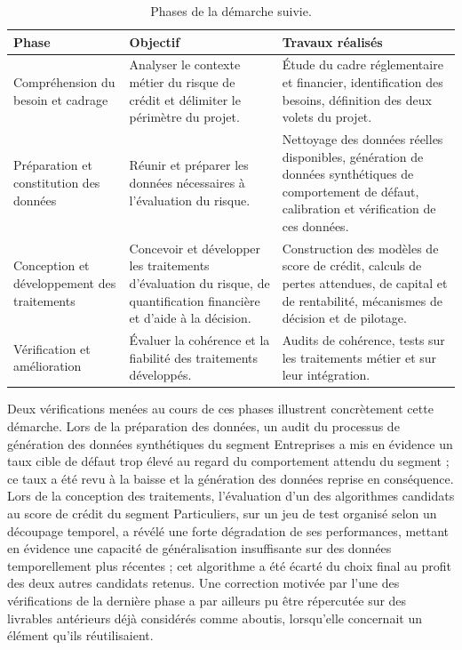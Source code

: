 \begin{table}[htbp]
    \centering
    \footnotesize
    \caption{Phases de la démarche suivie.}
    \label{tab:phases-demarche}
    \begin{tabular}{p{3.2cm}p{5cm}p{6cm}}
        \toprule
        \textbf{Phase} & \textbf{Objectif} & \textbf{Travaux réalisés} \\
        \midrule
        Compréhension du besoin et cadrage &
        Analyser le contexte métier du risque de crédit et délimiter le périmètre du projet. &
        Étude du cadre réglementaire et financier, identification des besoins, définition des deux volets du projet. \\
        \addlinespace
        Préparation et constitution des données &
        Réunir et préparer les données nécessaires à l'évaluation du risque. &
        Nettoyage des données réelles disponibles, génération de données synthétiques de comportement de défaut, calibration et vérification de ces données. \\
        \addlinespace
        Conception et développement des traitements &
        Concevoir et développer les traitements d'évaluation du risque, de quantification financière et d'aide à la décision. &
        Construction des modèles de score de crédit, calculs de pertes attendues, de capital et de rentabilité, mécanismes de décision et de pilotage. \\
        \addlinespace
        Vérification et amélioration &
        Évaluer la cohérence et la fiabilité des traitements développés. &
        Audits de cohérence, tests sur les traitements métier et sur leur intégration. \\
        \bottomrule
    \end{tabular}
\end{table}

Deux vérifications menées au cours de ces phases illustrent concrètement cette démarche. Lors de la préparation des données, un audit du processus de génération des données synthétiques du segment Entreprises a mis en évidence un taux cible de défaut trop élevé au regard du comportement attendu du segment ; ce taux a été revu à la baisse et la génération des données reprise en conséquence. Lors de la conception des traitements, l'évaluation d'un des algorithmes candidats au score de crédit du segment Particuliers, sur un jeu de test organisé selon un découpage temporel, a révélé une forte dégradation de ses performances, mettant en évidence une capacité de généralisation insuffisante sur des données temporellement plus récentes ; cet algorithme a été écarté du choix final au profit des deux autres candidats retenus. Une correction motivée par l'une des vérifications de la dernière phase a par ailleurs pu être répercutée sur des livrables antérieurs déjà considérés comme aboutis, lorsqu'elle concernait un élément qu'ils réutilisaient.

